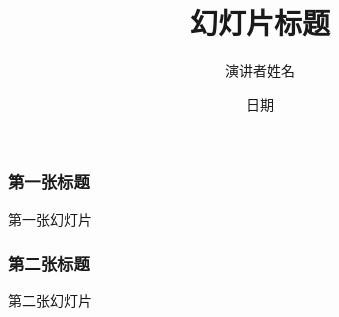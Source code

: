 \documentclass[12pt,a4paper]{beamer}
\begin{document}
\title{幻灯片标题}
\author{演讲者姓名}
\date{日期}

\begin{frame}
    \titlepage
\end{frame}

\begin{frame}
    \frametitle{第一张标题}
    第一张幻灯片
\end{frame}

\begin{frame}
    \frametitle{第二张标题}
    第二张幻灯片
\end{frame}
\end{document}
